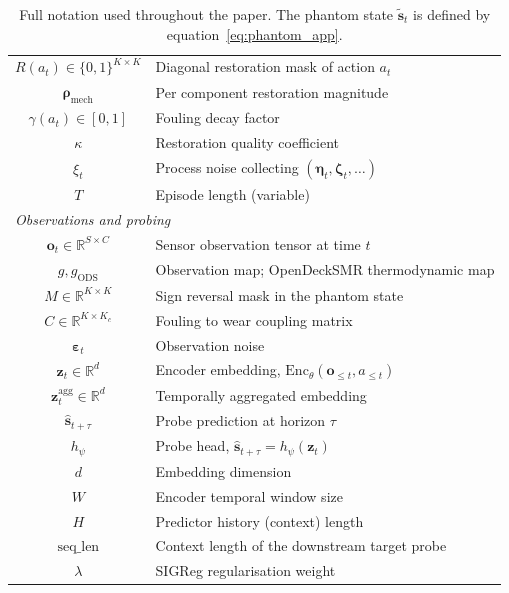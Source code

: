 \begin{table}[h]
\begin{tabular}{cl}
$R(a_t) \in \{0,1\}^{K \times K}$             & Diagonal restoration mask of action $a_t$ \\
$\boldsymbol{\rho}_\mathrm{mech}$             & Per component restoration magnitude \\
$\gamma(a_t) \in [0,1]$                       & Fouling decay factor \\
$\kappa$                                      & Restoration quality coefficient \\
$\xi_t$                                       & Process noise collecting $(\boldsymbol{\eta}_t, \boldsymbol{\zeta}_t, \ldots)$ \\
$T$                                           & Episode length (variable) \\
\midrule
\multicolumn{2}{l}{\textit{Observations and probing}} \\
$\mathbf{o}_t \in \mathbb{R}^{S \times C}$    & Sensor observation tensor at time $t$ \\
$g, g_\mathrm{ODS}$                           & Observation map; OpenDeckSMR thermodynamic map \\
$M \in \mathbb{R}^{K \times K}$               & Sign reversal mask in the phantom state \\
$C \in \mathbb{R}^{K \times K_c}$             & Fouling to wear coupling matrix \\
$\boldsymbol{\varepsilon}_t$                  & Observation noise \\
$\mathbf{z}_t \in \mathbb{R}^d$               & Encoder embedding, $\mathrm{Enc}_\theta(\mathbf{o}_{\le t}, a_{\le t})$ \\
$\mathbf{z}^\mathrm{agg}_t \in \mathbb{R}^d$  & Temporally aggregated embedding \\
$\hat{\mathbf{s}}_{t+\tau}$                   & Probe prediction at horizon $\tau$ \\
$h_\psi$                                      & Probe head, $\hat{\mathbf{s}}_{t+\tau} = h_\psi(\mathbf{z}_t)$ \\
$d$                                           & Embedding dimension \\
$W$                                           & Encoder temporal window size \\
$H$                                           & Predictor history (context) length \\
$\mathrm{seq\_len}$                           & Context length of the downstream target probe \\
$\lambda$                                     & SIGReg regularisation weight \\
\bottomrule
\end{tabular}
\caption{Full notation used throughout the paper. The phantom state $\tilde{\mathbf{s}}_t$ is defined by equation~\ref{eq:phantom_app}.}
\label{tab:notation_full}
\end{table}


